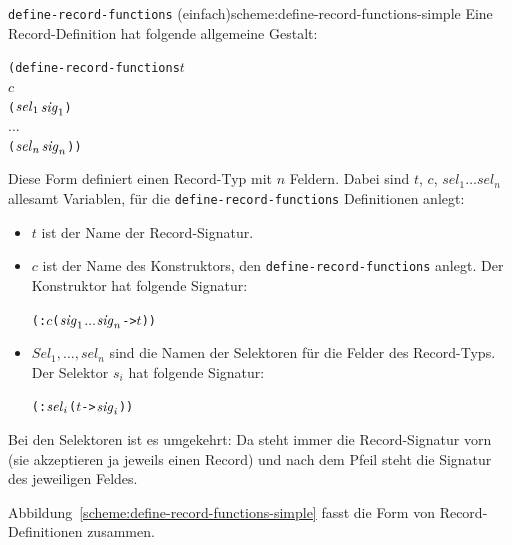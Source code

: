 \begin{feature}{\texttt{define-record-functions} (einfach)}{scheme:define-record-functions-simple}
Eine Record-Definition
hat folgende allgemeine Gestalt:\label{def:define-record-functions}
%
\begin{alltt}
(define-record-functions \(t\)
  \(c\)
  (\(\mathit{sel}\sb{1}\) \(\mathit{sig}\sb{1}\))
  \(\ldots\)
  (\(\mathit{sel}\sb{n}\) \(\mathit{sig}\sb{n}\)))
\end{alltt}
%
Diese Form definiert einen Record-Typ mit $n$ Feldern.
Dabei sind $t$, $c$, $\mathit{sel}_1 \ldots \mathit{sel}_n$ allesamt Variablen, für die
\texttt{define-record-functions} Definitionen anlegt:
%
\begin{itemize}
\item $t$ ist der Name der Record-Signatur.
\item $c$ ist der Name des Konstruktors, den
  \texttt{define-record-functions} anlegt.  Der Konstruktor hat 
  folgende Signatur:
%  
\begin{alltt}
(: \(c\) (\(\mathit{sig}\sb{1}\) \(\ldots\) \(\mathit{sig}\sb{n}\) -> \(t\)))
\end{alltt}
\item $\mathit{Sel}_1, \ldots, \mathit{sel}_n$ sind die Namen der Selektoren für die Felder
  des Record-Typs.  Der Selektor $s_i$ hat folgende Signatur:
% 
\begin{alltt}
(: \(\mathit{sel}\sb{i}\) (\(t\) -> \(\mathit{sig}\sb{i}\)))
\end{alltt}
\end{itemize}
%
\end{feature}

Bei den Selektoren ist es umgekehrt: Da steht immer die Record-Signatur
vorn (sie akzeptieren ja jeweils einen Record) und nach dem Pfeil
steht die Signatur des jeweiligen Feldes.

Abbildung~\ref{scheme:define-record-functions-simple} fasst die Form
von Record-Definitionen zusammen.

